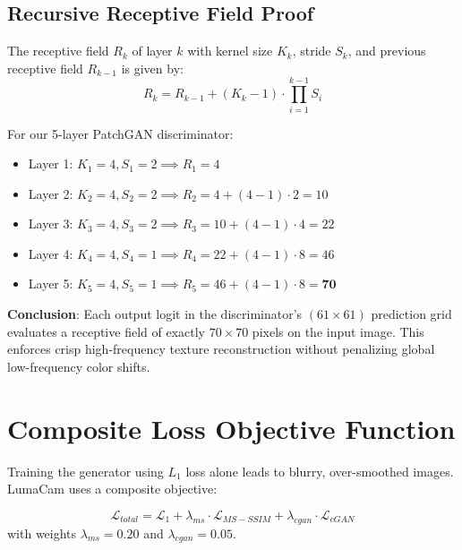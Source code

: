 \subsection{Recursive Receptive Field Proof}
The receptive field $R_k$ of layer $k$ with kernel size $K_k$, stride $S_k$, and previous receptive field $R_{k-1}$ is given by:
\begin{equation}
R_k = R_{k-1} + (K_k - 1) \cdot \prod_{i=1}^{k-1} S_i
\label{eq:receptive_field}
\end{equation}

For our 5-layer PatchGAN discriminator:
\begin{itemize}
    \item Layer 1: $K_1 = 4, S_1 = 2 \implies R_1 = 4$
    \item Layer 2: $K_2 = 4, S_2 = 2 \implies R_2 = 4 + (4 - 1) \cdot 2 = 10$
    \item Layer 3: $K_3 = 4, S_3 = 2 \implies R_3 = 10 + (4 - 1) \cdot 4 = 22$
    \item Layer 4: $K_4 = 4, S_4 = 1 \implies R_4 = 22 + (4 - 1) \cdot 8 = 46$
    \item Layer 5: $K_5 = 4, S_5 = 1 \implies R_5 = 46 + (4 - 1) \cdot 8 = \mathbf{70}$
\end{itemize}

\textbf{Conclusion}: Each output logit in the discriminator's $(61 \times 61)$ prediction grid evaluates a receptive field of exactly $70 \times 70$ pixels on the input image. This enforces crisp high-frequency texture reconstruction without penalizing global low-frequency color shifts.

\section{Composite Loss Objective Function}
Training the generator using $L_1$ loss alone leads to blurry, over-smoothed images. LumaCam uses a composite objective:

\begin{equation}
\mathcal{L}_{total} = \mathcal{L}_1 + \lambda_{ms} \cdot \mathcal{L}_{MS-SSIM} + \lambda_{cgan} \cdot \mathcal{L}_{cGAN}
\label{eq:composite_loss}
\end{equation}
with weights $\lambda_{ms} = 0.20$ and $\lambda_{cgan} = 0.05$.

